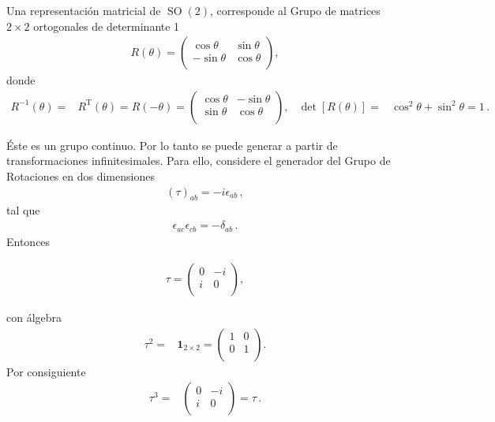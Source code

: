 \begin{frame}
Una representación matricial de $\operatorname{SO}(2)$, corresponde al Grupo de matrices $2\times 2$ ortogonales de determinante 1
\begin{align*}
  R(\theta)=
  \begin{pmatrix}
  \cos\theta &\sin\theta\\  
  -\sin\theta&\cos\theta\\  
  \end{pmatrix},
\end{align*}
donde
\begin{align*}
  R^{-1}(\theta)=& R^{\operatorname{T}}(\theta)=R(-\theta)
=
  \begin{pmatrix}
  \cos\theta &-\sin\theta\\  
  \sin\theta&\cos\theta\\  
  \end{pmatrix}, & \det[R(\theta)]=&\cos^2\theta+\sin^2\theta=1\,.
\end{align*}

Éste es  un grupo continuo. Por lo tanto se puede generar a partir de transformaciones infinitesimales.
Para ello,
considere el generador del Grupo de Rotaciones en dos dimensiones
\begin{align}
  \label{eq:ieab}
(\tau)_{ab}=-i \epsilon_{ab}\,, 
\end{align}
tal que
\begin{align*}
\epsilon_{ac}\epsilon_{cb}=-\delta_{ab}\,.
\end{align*}
Entonces  

\begin{align}
  \label{eq:so2g}
  \tau=
  \begin{pmatrix}
   0 & -i \\
   i & 0 \\    
  \end{pmatrix},
\end{align}
\end{frame}
con álgebra
\begin{align}
  \tau^2=&\boldsymbol{1}_{2\times2}=
  \begin{pmatrix}
    1 & 0\\
    0 & 1\\
  \end{pmatrix}. 
\end{align}
Por consiguiente
\begin{align*}
  \tau^3=&  \begin{pmatrix}
    0 & -i\\
    i & 0\\
  \end{pmatrix}=\tau\,.
\end{align*}

